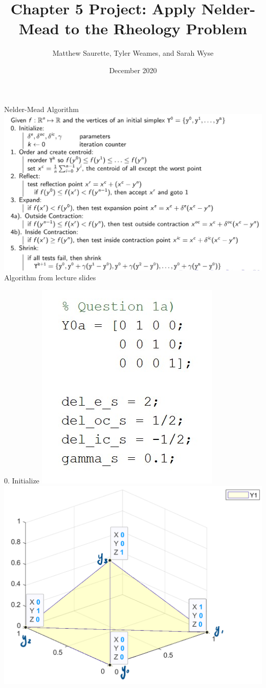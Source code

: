 \documentclass{beamer}
\title[Nelder-Mead on the Rheology Problem]{Chapter 5 Project: Apply Nelder-Mead to the Rheology Problem}
\author[Matthew, Tyler, and Sarah]{Matthew Saurette, Tyler Weames, and Sarah Wyse}
\institute[Math 462]{Math 462\\ University of British Columbia - Okanagan}
\date{December 2020}
\begin{document}
\maketitle




\begin{frame}{Nelder-Mead Algorithm}
    \centering
    \includegraphics[width=0.95\linewidth]{NMAlgorithm}\\
    \tiny
	\hfill Algorithm from lecture slides    
\end{frame}

\begin{frame}{0. Initialize}
	\centering
	\includegraphics[width=0.35\linewidth]{Initialize}
	\includegraphics[width=0.59\linewidth]{InitializeFig}
\end{frame}
\end{document}
